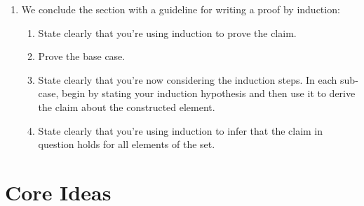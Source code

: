 \begin{enumerate}[{\thesection}.1]
\begin{proof}
			So, we conclude our theorem by induction over the gargles.
			
			\end{proof}

	\item We conclude the section with a guideline for writing a proof by induction:
	
		\begin{enumerate}[1.]
		
			\item State clearly that you're using induction to prove the claim.
			
			\item Prove the base case. 
			
			\item State clearly that you're now considering the induction steps. In each sub-case, begin by stating your induction hypothesis and then use it to derive the claim about the constructed element.
			
			\item State clearly that you're using induction to infer that the claim in question holds for all elements of the set.
		
		\end{enumerate}
		
\end{enumerate}

\section{Core Ideas}

